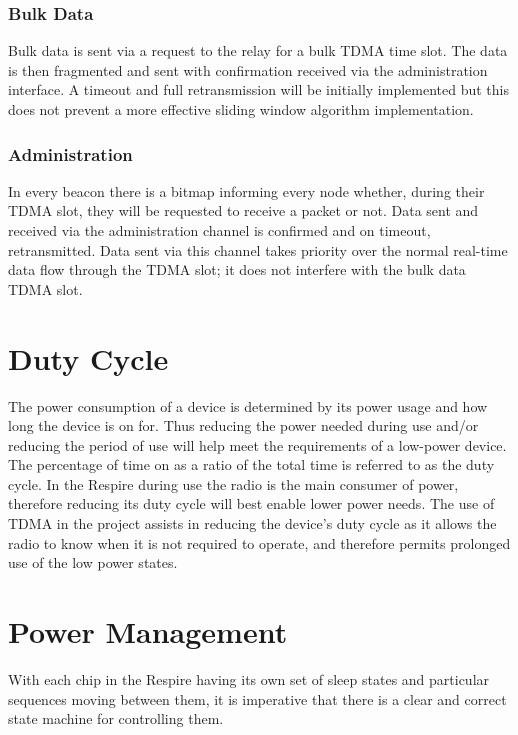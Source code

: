 
\subsubsection{Bulk Data}
Bulk data is sent via a request to the relay for a bulk \ac{TDMA} time slot. The data is then fragmented
and sent with confirmation received via the administration interface. A timeout and full
retransmission will be initially implemented but this does not prevent a more effective sliding
window algorithm implementation.

\subsubsection{Administration}
In every beacon there is a bitmap informing every node whether, during their \ac{TDMA} slot, they will
be requested to receive a packet or not. Data sent and received via the administration channel is
confirmed and on timeout, retransmitted. Data sent via this channel takes priority over the normal
real-time data flow through the \ac{TDMA} slot; it does not interfere with the bulk data \ac{TDMA} slot.


\section{Duty Cycle}
The power consumption of a device is determined by its power usage and how long the device is on
for. Thus reducing the power needed during use and/or reducing the period of use will help meet
the requirements of a low-power device. The percentage of time on as a ratio of the total time is
referred to as the duty cycle. In the Respire during use the radio is the main consumer of power,
therefore reducing its duty cycle will best enable lower power needs. The use of \ac{TDMA} in the project
assists in reducing the device’s duty cycle as it allows the radio to know when it is not required to
operate, and therefore permits prolonged use of the low power states.


\section{Power Management}
With each chip in the Respire having its own set of sleep states and particular sequences moving
between them, it is imperative that there is a clear and correct state machine for controlling them.


